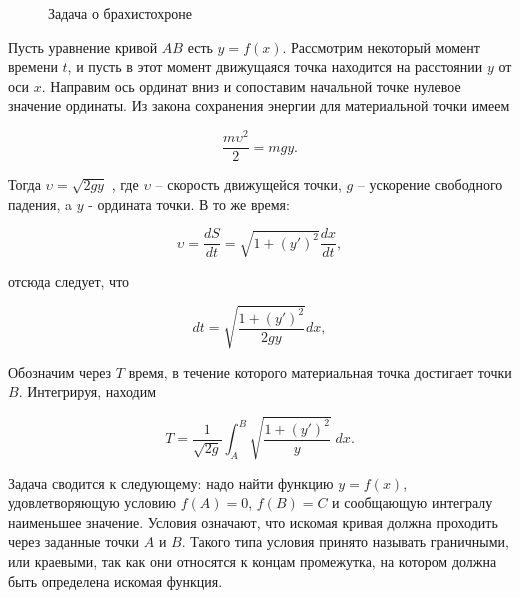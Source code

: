 \documentclass{article}
\begin{document}
\begin{figure}[h!]
\caption{Задача о брахистохроне}
\label{img_brachistochrone}
\end{figure}

Пусть уравнение кривой $AB$ есть $y = f(x)$. Рассмотрим некоторый момент времени $t$, и пусть в этот момент движущаяся точка находится на расстоянии $y$ от оси $x$. Направим ось ординат вниз и сопоставим начальной точке нулевое значение ординаты. Из закона сохранения энергии для материальной точки имеем

\begin{displaymath}
    \frac{m\upsilon^2}{2} = mgy.
\end{displaymath}

Тогда $\upsilon = \sqrt{2gy}$ , где $\upsilon$ – скорость движущейся точки, $g$ – ускорение свободного падения, a $y$ - ордината точки. В то же время:

\begin{displaymath}
    \upsilon = \frac{dS}{dt} = \sqrt{1 + (y')^2} \frac{dx}{dt},
\end{displaymath}

\noindent отсюда следует, что

\begin{displaymath}
    dt = \sqrt{\frac{1 + (y')^2}{2gy}}dx,
\end{displaymath}

\noindent Обозначим через $T$ время, в течение которого материальная точка достигает точки $B$. Интегрируя, находим

\begin{displaymath}
    T = \frac{1}{\sqrt{2g}} \int_{A}^{B} \sqrt{\frac{1 + (y')^2}{y}} \; dx.
\end{displaymath}

\noindent Задача сводится к следующему: надо найти функцию $y = f(x)$, удовлетворяющую условию $f(A) = 0$, $f(B) = C$ и сообщающую интегралу наименьшее значение. Условия означают, что искомая кривая должна проходить через заданные точки $A$ и $B$. Такого типа условия принято называть граничными, или краевыми, так как они относятся к концам промежутка, на котором должна быть определена искомая функция.
\end{document}

